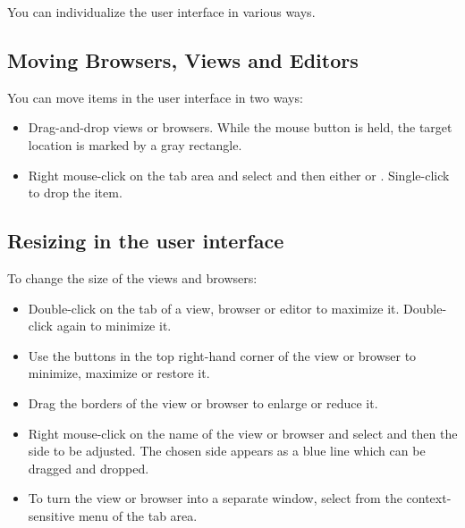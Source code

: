 \label{adapting views}
You can individualize the  user interface in various ways. 

\subsection{Moving Browsers, Views and Editors}
You can move items in the user interface  in two ways:

\begin{itemize}
\item Drag-and-drop views or browsers. While the mouse button
 is held, the target location is marked by a gray rectangle.
\item Right mouse-click on the tab area and select
 and then either  or .
Single-click to drop the item. 
\end{itemize}

\subsection{Resizing in the user interface}

To change the size of the views and browsers:
\begin{itemize}
\item Double-click on the tab of a view, browser or editor to maximize it. Double-click again to minimize it.
\item  Use the buttons in the  top right-hand corner of the view or browser to 
minimize, maximize or restore it.  
\item Drag the borders of the view or browser to enlarge or reduce it.
\item Right mouse-click on the name of the view or browser and select
 and then the side to be adjusted. The chosen side 
appears as a blue line which can be dragged and dropped. 
\item To turn the view or browser into a separate window, select 
\mbox{}
 from
the context-sensitive menu of the tab area. 
\end{itemize}  

